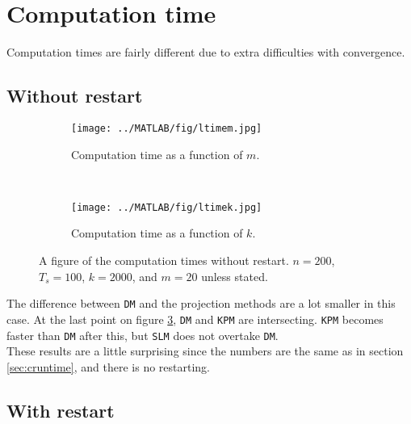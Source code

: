 \section{Computation time} %
Computation times are fairly different due to extra difficulties with convergence.
\subsection{Without restart}
\begin{figure}[H]
        \centering
        \begin{subfigure}[b]{0.45\textwidth}
                \texttt{[image: ../MATLAB/fig/ltimem.jpg]}
                \caption{ Computation time as a function of $m$. }
                \label{fig:ltimem}
        \end{subfigure}
        ~
        \begin{subfigure}[b]{0.45\textwidth}
                \texttt{[image: ../MATLAB/fig/ltimek.jpg]}
                \caption{ Computation time as a function of $k$. }
                \label{fig:ltimek}
        \end{subfigure}
        \caption{ A figure of the computation times without restart. $n = 200$, $T_s = 100$, $k = 2000$, and $m = 20$ unless stated. }
        \label{fig:ltime0}
\end{figure}
The difference between \texttt{DM} and the projection methods are a lot smaller in this case. At the last point on figure \ref{fig:ltime0}, \texttt{DM} and \texttt{KPM} are intersecting. \texttt{KPM} becomes faster than \texttt{DM} after this, but \texttt{SLM} does not overtake \texttt{DM}. \\
These results are a little surprising since the numbers are the same as in section \ref{sec:cruntime}, and there is no restarting. 

\subsection{With restart}

